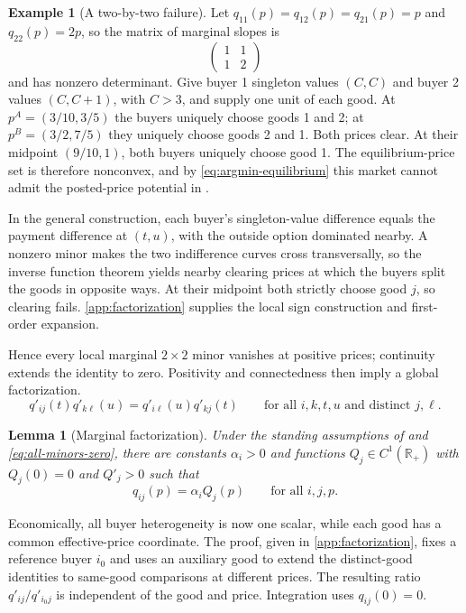 \documentclass[11pt,a4paper,fleqn]{article}
\theoremstyle{plain}
\newtheorem{lemma}{Lemma}[section]
\theoremstyle{definition}
\newtheorem{example}{Example}
\newcommand{\R}{\mathbb{R}}
\begin{document}
\begin{example}[A two-by-two failure]\label{ex:two-by-two}
Let $q_{11}(p)=q_{12}(p)=q_{21}(p)=p$ and $q_{22}(p)=2p$, so the matrix of marginal slopes is
\[
\begin{pmatrix}1&1\\1&2\end{pmatrix}
\]
and has nonzero determinant. Give buyer 1 singleton values $(C,C)$ and buyer 2 values $(C,C+1)$, with $C>3$, and supply one unit of each good. At $p^A=(3/10,3/5)$ the buyers uniquely choose goods 1 and 2; at $p^B=(3/2,7/5)$ they uniquely choose goods 2 and 1. Both prices clear. At their midpoint $(9/10,1)$, both buyers uniquely choose good 1. The equilibrium-price set is therefore nonconvex, and by \eqref{eq:argmin-equilibrium} this market cannot admit the posted-price potential in .
\end{example}

In the general construction, each buyer's singleton-value difference equals the payment difference at $(t,u)$, with the outside option dominated nearby. A nonzero minor makes the two indifference curves cross transversally, so the inverse function theorem yields nearby clearing prices at which the buyers split the goods in opposite ways. At their midpoint both strictly choose good $j$, so clearing fails. \ref{app:factorization} supplies the local sign construction and first-order expansion.

Hence every local marginal $2\times2$ minor vanishes at positive prices; continuity extends the identity to zero. Positivity and connectedness then imply a global factorization.
\begin{equation}\label{eq:all-minors-zero}
q'_{ij}(t)q'_{k\ell}(u)
=q'_{i\ell}(u)q'_{kj}(t)
\qquad\text{for all }i,k,t,u\text{ and distinct }j,\ell.
\end{equation}

\begin{lemma}[Marginal factorization]\label{lem:smooth-factorization}
Under the standing assumptions of  and \eqref{eq:all-minors-zero}, there are constants $\alpha_i>0$ and functions $Q_j\in C^1(\R_+)$ with $Q_j(0)=0$ and $Q'_j>0$ such that
\begin{equation}\label{eq:smooth-factorization}
q_{ij}(p)=\alpha_iQ_j(p)
\qquad\text{for all }i,j,p.
\end{equation}
\end{lemma}

Economically, all buyer heterogeneity is now one scalar, while each good has a common effective-price coordinate. The proof, given in \ref{app:factorization}, fixes a reference buyer $i_0$ and uses an auxiliary good to extend the distinct-good identities to same-good comparisons at different prices. The resulting ratio $q'_{ij}/q'_{i_0j}$ is independent of the good and price. Integration uses $q_{ij}(0)=0$.
\end{document}
